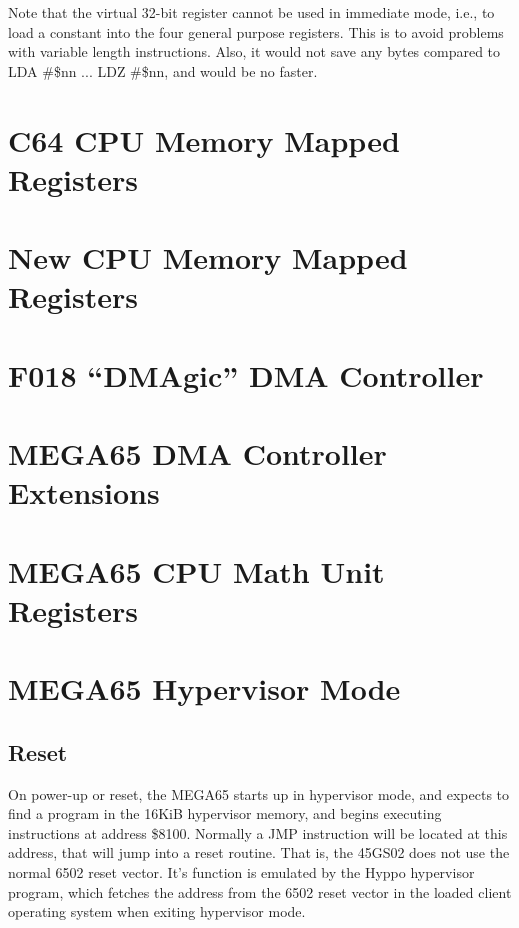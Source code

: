 Note that the virtual 32-bit register cannot be used in immediate mode, i.e., to load a constant into the four general
purpose registers.  This is to
avoid problems with variable length instructions. Also, it would not save any bytes
compared to LDA #\$nn ... LDZ #\$nn, and would be no faster.


\section{C64 CPU Memory Mapped Registers}



\section{New CPU Memory Mapped Registers}



\section{F018 ``DMAgic'' DMA Controller}



\section{MEGA65 DMA Controller Extensions}



\section{MEGA65 CPU Math Unit Registers}



\section{MEGA65 Hypervisor Mode}

\subsection{Reset}

On power-up or reset, the MEGA65 starts up in hypervisor mode, and expects to find a program in the
16KiB hypervisor memory, and begins executing instructions at address \$8100.  Normally a JMP instruction
will be located at this address, that will jump into a reset routine. That is, the 45GS02
does not use the normal 6502 reset vector. It's function is emulated by the Hyppo hypervisor program,
which fetches the address from the 6502 reset vector in the loaded client operating system when
exiting hypervisor mode.

